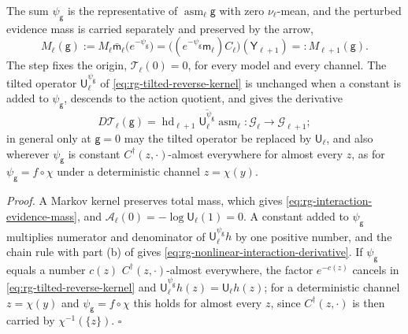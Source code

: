 The sum $\psi_{\mathsf g}$ is the representative of
$\operatorname{asm}_\ell\mathsf g$ with zero $\nu_\ell$-mean, and the perturbed
evidence mass is carried separately and preserved by the arrow,
\begin{equation}
M_\ell(\mathsf g):=M_\ell\bar{\mathsf m}_\ell\bigl(e^{-\psi_{\mathsf g}}\bigr)
=\bigl((e^{-\psi_{\mathsf g}}\mathsf m_\ell)C_\ell\bigr)(\mathsf Y_{\ell+1})
=:M_{\ell+1}(\mathsf g).
\label{eq:rg-interaction-evidence-mass}
\end{equation}
The step fixes the origin, $\mathcal T_\ell(0)=0$, for every model and every
channel. The tilted operator $\mathsf U_\ell^{\psi_{\mathsf g}}$ of
\eqref{eq:rg-tilted-reverse-kernel} is unchanged when a constant is added to
$\psi_{\mathsf g}$, descends to the action quotient, and gives the derivative
\begin{equation}
D\mathcal T_\ell(\mathsf g)
=\operatorname{hd}_{\ell+1}\overline{\mathsf U_\ell^{\psi_{\mathsf g}}}\operatorname{asm}_\ell:
\mathcal G_\ell\longrightarrow\mathcal G_{\ell+1};
\label{eq:rg-nonlinear-interaction-derivative}
\end{equation}
in general only at $\mathsf g=0$ may the tilted operator be replaced by $\mathsf U_\ell$, and
also wherever $\psi_{\mathsf g}$ is constant $C^\dagger(z,\cdot)$-almost everywhere for almost
every $z$, as for $\psi_{\mathsf g}=f\circ\chi$ under a deterministic channel $z=\chi(y)$.

\noindent\emph{Proof.}
A Markov kernel preserves total mass, which gives
\eqref{eq:rg-interaction-evidence-mass}, and
$\mathcal A_\ell(0)=-\log\mathsf U_\ell(1)=0$. A constant added to $\psi_{\mathsf g}$
multiplies numerator and denominator of $\mathsf U_\ell^{\psi_{\mathsf g}}h$ by one
positive number, and the chain rule with part (b) of
 gives
\eqref{eq:rg-nonlinear-interaction-derivative}. If $\psi_{\mathsf g}$ equals a number $c(z)$
$C^\dagger(z,\cdot)$-almost everywhere, the factor $e^{-c(z)}$ cancels in
\eqref{eq:rg-tilted-reverse-kernel} and $\mathsf U_\ell^{\psi_{\mathsf g}}h(z)=\mathsf U_\ell h(z)$;
for a deterministic channel $z=\chi(y)$ and $\psi_{\mathsf g}=f\circ\chi$ this holds for almost
every $z$, since $C^\dagger(z,\cdot)$ is then carried by $\chi^{-1}(\{z\})$. $\square$

